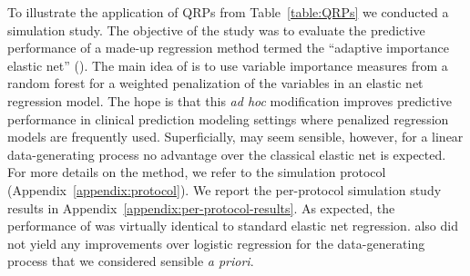 \documentclass[a4paper, 11pt]{article}
\begin{document}
To illustrate the application of QRPs from Table~\ref{table:QRPs} we conducted
a simulation study. The objective of the study was to evaluate the predictive
performance of a made-up regression method termed the ``adaptive importance
elastic net'' (\ainet). The main idea of \ainet{} is to use variable
importance measures from a random forest for a weighted penalization of the
variables in an elastic net regression model. The hope is that this \emph{ad hoc}
modification improves predictive performance in clinical prediction modeling
settings where penalized regression models are frequently used. Superficially,
\ainet{} may seem sensible, however, for a linear data-generating process no
advantage over the classical elastic net is expected. For more details
on the method, we refer to the simulation protocol (Appendix~\ref{appendix:protocol}). 
We report the per-protocol simulation study results in
Appendix~\ref{appendix:per-protocol-results}. As expected, 
the performance of \ainet{} was virtually identical to standard elastic net
regression.  \ainet{} also did not yield any improvements over logistic
regression for the  data-generating process that we considered sensible 
\emph{a priori}.
\end{document}
